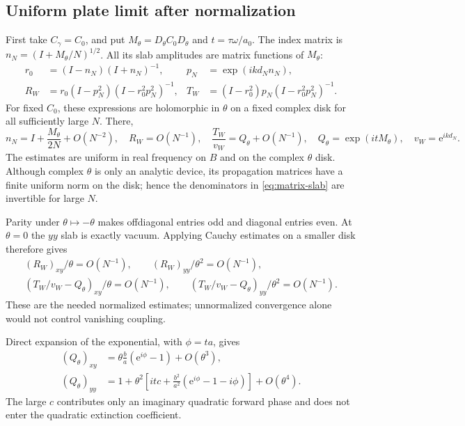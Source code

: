 \documentclass[11pt]{article}
\newcommand{\ee}{\mathrm e}
\begin{document}
\subsection{Uniform plate limit after normalization}
First take $C_\gamma=C_0$, and put
$M_\theta=D_\theta C_0D_\theta$ and $t=\tau\omega/a_0$. The index matrix is
$n_N=(I+M_\theta/N)^{1/2}$. All its slab amplitudes are matrix functions of
$M_\theta$:
\begin{align}
 r_0&=(I-n_N)(I+n_N)^{-1},& p_N&=\exp(ikd_Nn_N),\nonumber\\
 R_W&=r_0(I-p_N^2)(I-r_0^2p_N^2)^{-1},&
 T_W&=(I-r_0^2)p_N(I-r_0^2p_N^2)^{-1}.\label{eq:matrix-slab}
\end{align}
For fixed $C_0$, these expressions are holomorphic in $\theta$ on a fixed
complex disk for all sufficiently large $N$. There,
\[
 n_N=I+\frac{M_\theta}{2N}+O(N^{-2}),\quad
 R_W=O(N^{-1}),\quad
 \frac{T_W}{v_W}=Q_\theta+O(N^{-1}),\quad
 Q_\theta=\exp(itM_\theta),\quad v_W=\ee^{ikd_N}.
\]
The estimates are uniform in real frequency on $B$ and on the complex
$\theta$ disk. Although complex $\theta$ is only an analytic device, its
propagation matrices have a finite uniform norm on the disk; hence the
denominators in \eqref{eq:matrix-slab} are invertible for large $N$.

Parity under $\theta\mapsto-\theta$ makes offdiagonal entries odd and diagonal
entries even. At $\theta=0$ the $yy$ slab is exactly vacuum. Applying Cauchy
estimates on a smaller disk therefore gives
\begin{gather}
 (R_W)_{xy}/\theta=O(N^{-1}),\qquad
 (R_W)_{yy}/\theta^2=O(N^{-1}),\nonumber\\
 (T_W/v_W-Q_\theta)_{xy}/\theta=O(N^{-1}),\qquad
 (T_W/v_W-Q_\theta)_{yy}/\theta^2=O(N^{-1}).\label{eq:normalized-slab}
\end{gather}
These are the needed normalized estimates; unnormalized convergence alone
would not control vanishing coupling.

Direct expansion of the exponential, with $\phi=ta$, gives
\begin{align}
 (Q_\theta)_{xy}
 &=\theta\frac ba(\ee^{i\phi}-1)+O(\theta^3),\label{eq:Qxy}\\
 (Q_\theta)_{yy}
 &=1+\theta^2\left[
 itc+\frac{b^2}{a^2}(\ee^{i\phi}-1-i\phi)\right]+O(\theta^4).\label{eq:Qyy}
\end{align}
The large $c$ contributes only an imaginary quadratic forward phase and does
not enter the quadratic extinction coefficient.
\end{document}
